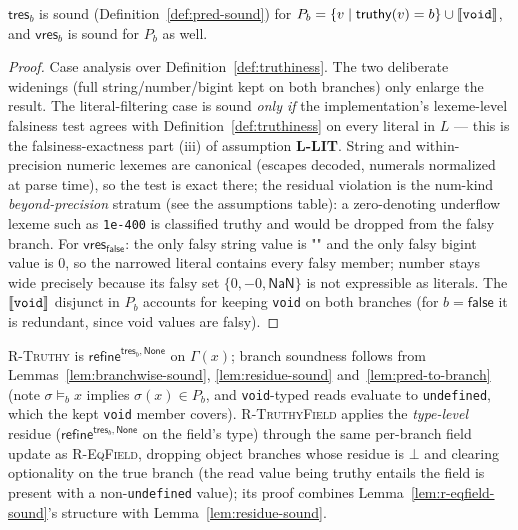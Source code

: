 \documentclass[11pt]{article}
\newcommand{\refineop}{\mathsf{refine}}
\newcommand{\Env}{\Gamma}
\begin{document}
\begin{lemma}
\label{lem:residue-sound}
$\mathsf{tres}_b$ is sound (Definition~\ref{def:pred-sound}) for
$P_b = \{v \mid \mathsf{truthy}(v) = b\} \cup \llbracket \texttt{void} \rrbracket$, and
$\mathsf{vres}_b$ is sound for $P_b$ as well.
\end{lemma}
\begin{proof}
Case analysis over Definition~\ref{def:truthiness}. The two deliberate
widenings (full string/number/bigint kept on both branches) only enlarge the
result. The literal-filtering case is sound \emph{only if} the
implementation's lexeme-level falsiness test agrees with
Definition~\ref{def:truthiness} on every literal in $L$ — this is the
falsiness-exactness part (iii) of assumption \textbf{L-LIT}. String and
within-precision numeric lexemes are canonical (escapes decoded, numerals
normalized at parse time), so the test is exact there; the residual
violation is the num-kind \emph{beyond-precision} stratum (see the
assumptions table): a zero-denoting underflow lexeme such as
\texttt{1e-400} is classified truthy and would be dropped from the falsy
branch. For $\mathsf{vres}_{\mathsf{false}}$: the only falsy string value is
$\texttt{""}$ and the only falsy bigint value is $0$, so the narrowed
literal contains every falsy member; number stays wide precisely because its
falsy set $\{0, -0, \mathsf{NaN}\}$ is not expressible as literals.
The $\llbracket \texttt{void} \rrbracket$ disjunct in $P_b$ accounts for keeping
\texttt{void} on both branches (for $b = \mathsf{false}$ it is redundant,
since void values are falsy).
\end{proof}

\textsc{R-Truthy} is $\refineop^{\mathsf{tres}_b, \mathsf{None}}$ on
$\Env(x)$; branch soundness follows from
Lemmas~\ref{lem:branchwise-sound}, \ref{lem:residue-sound}
and~\ref{lem:pred-to-branch} (note $\sigma \models_b x$ implies
$\sigma(x) \in P_b$, and \texttt{void}-typed reads evaluate to
\texttt{undefined}, which the kept \texttt{void} member covers).
\textsc{R-TruthyField} applies the \emph{type-level} residue
($\refineop^{\mathsf{tres}_b,\mathsf{None}}$ on the field's type) through the
same per-branch field update as \textsc{R-EqField}, dropping object branches whose
residue is $\bot$ and clearing optionality on the true branch (the read
value being truthy entails the field is present with a non-\texttt{undefined}
value); its proof combines Lemma~\ref{lem:r-eqfield-sound}'s structure with
Lemma~\ref{lem:residue-sound}.
\end{document}
